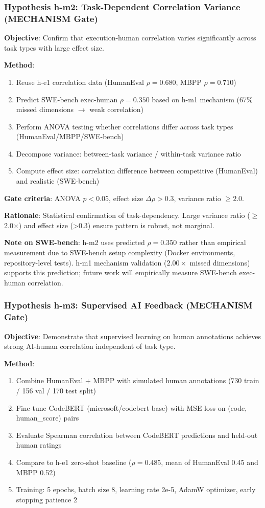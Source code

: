 \subsubsection{Hypothesis h-m2: Task-Dependent Correlation Variance (MECHANISM Gate)}

\textbf{Objective}: Confirm that execution-human correlation varies significantly across task types with large effect size.

\textbf{Method}:
\begin{enumerate}
\item Reuse h-e1 correlation data (HumanEval $\rho=0.680$, MBPP $\rho=0.710$)
\item Predict SWE-bench exec-human $\rho=0.350$ based on h-m1 mechanism (67\% missed dimensions $\rightarrow$ weak correlation)
\item Perform ANOVA testing whether correlations differ across task types (HumanEval/MBPP/SWE-bench)
\item Decompose variance: between-task variance / within-task variance ratio
\item Compute effect size: correlation difference between competitive (HumanEval) and realistic (SWE-bench)
\end{enumerate}

\textbf{Gate criteria}: ANOVA $p<0.05$, effect size $\Delta\rho > 0.3$, variance ratio $\geq 2.0$.

\textbf{Rationale}: Statistical confirmation of task-dependency. Large variance ratio ($\geq$2.0$\times$) and effect size (>0.3) ensure pattern is robust, not marginal.

\textbf{Note on SWE-bench}: h-m2 uses predicted $\rho=0.350$ rather than empirical measurement due to SWE-bench setup complexity (Docker environments, repository-level tests). h-m1 mechanism validation ($2.00\times$ missed dimensions) supports this prediction; future work will empirically measure SWE-bench exec-human correlation.

\subsubsection{Hypothesis h-m3: Supervised AI Feedback (MECHANISM Gate)}

\textbf{Objective}: Demonstrate that supervised learning on human annotations achieves strong AI-human correlation independent of task type.

\textbf{Method}:
\begin{enumerate}
\item Combine HumanEval + MBPP with simulated human annotations (730 train / 156 val / 170 test split)
\item Fine-tune CodeBERT (microsoft/codebert-base) with MSE loss on (code, human\_score) pairs
\item Evaluate Spearman correlation between CodeBERT predictions and held-out human ratings
\item Compare to h-e1 zero-shot baseline ($\rho=0.485$, mean of HumanEval 0.45 and MBPP 0.52)
\item Training: 5 epochs, batch size 8, learning rate 2e-5, AdamW optimizer, early stopping patience 2
\end{enumerate}

